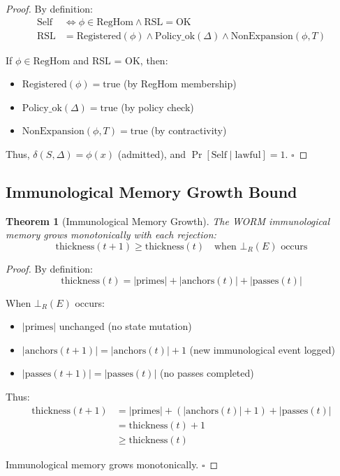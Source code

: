 \documentclass[11pt,a4paper]{article}
\newtheorem{theorem}{Theorem}[section]
\begin{document}
\begin{proof}
By definition:
\begin{align}
\text{Self} &\iff \phi \in \text{RegHom} \land \text{RSL} = \text{OK} \\
\text{RSL} &= \text{Registered}(\phi) \land \text{Policy\_ok}(\Delta) \land \text{NonExpansion}(\phi, T)
\end{align}

If $\phi \in \text{RegHom}$ and RSL = OK, then:
\begin{itemize}
    \item $\text{Registered}(\phi) = \text{true}$ (by RegHom membership)
    \item $\text{Policy\_ok}(\Delta) = \text{true}$ (by policy check)
    \item $\text{NonExpansion}(\phi, T) = \text{true}$ (by contractivity)
\end{itemize}

Thus, $\delta(S, \Delta) = \phi(x)$ (admitted), and $\Pr[\text{Self} \mid \text{lawful}] = 1$. \hfill$\square$
\end{proof}

\subsection{Immunological Memory Growth Bound}

\begin{theorem}[Immunological Memory Growth]\label{thm:memory_growth}
The WORM immunological memory grows monotonically with each rejection:
\begin{equation}
\text{thickness}(t+1) \geq \text{thickness}(t) \quad \text{when } \bot_R(E) \text{ occurs}
\end{equation}
\end{theorem}

\begin{proof}
By definition:
\begin{equation}
\text{thickness}(t) = |\text{primes}| + |\text{anchors}(t)| + |\text{passes}(t)|
\end{equation}

When $\bot_R(E)$ occurs:
\begin{itemize}
    \item $|\text{primes}|$ unchanged (no state mutation)
    \item $|\text{anchors}(t+1)| = |\text{anchors}(t)| + 1$ (new immunological event logged)
    \item $|\text{passes}(t+1)| = |\text{passes}(t)|$ (no passes completed)
\end{itemize}

Thus:
\begin{align}
\text{thickness}(t+1) &= |\text{primes}| + (|\text{anchors}(t)| + 1) + |\text{passes}(t)| \\
&= \text{thickness}(t) + 1 \\
&\geq \text{thickness}(t)
\end{align}

Immunological memory grows monotonically. \hfill$\square$
\end{proof}
\end{document}
